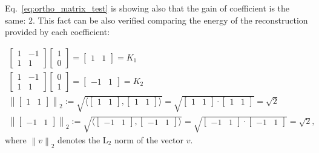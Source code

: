 Eq.~\ref{eq:ortho_matrix_test} is showing also that the gain of
coefficient is the same: $2$. This fact can be also verified comparing
the energy of the reconstruction provided by each coefficient:

\begin{equation*}
  \begin{array}{l}
    \begin{bmatrix}
      1 & -1 \\
      1 & 1
    \end{bmatrix}
    \begin{bmatrix}
      1 \\
      0
    \end{bmatrix}
    =
    \begin{bmatrix}
      1 & 1
    \end{bmatrix} = K_1
    \\
    \begin{bmatrix}
      1 & -1 \\
      1 & 1
    \end{bmatrix}
    \begin{bmatrix}
      0 \\
      1
    \end{bmatrix}
    =
    \begin{bmatrix}
      -1 & 1
    \end{bmatrix} = K_2
    \\
    \left\| \begin{bmatrix}1 & 1\end{bmatrix} \right\|_2 := \sqrt{\langle \begin{bmatrix}1 & 1\end{bmatrix}, \begin{bmatrix}1 & 1\end{bmatrix} \rangle} = \sqrt{\begin{bmatrix}1 & 1\end{bmatrix}\cdot \begin{bmatrix}1 & 1\end{bmatrix}} = \sqrt{2}\\
    \left\| \begin{bmatrix}-1 & 1\end{bmatrix} \right\|_2 := \sqrt{\langle \begin{bmatrix}-1 & 1\end{bmatrix}, \begin{bmatrix}-1 & 1\end{bmatrix} \rangle} = \sqrt{\begin{bmatrix}-1 & 1\end{bmatrix}\cdot \begin{bmatrix}-1 & 1\end{bmatrix}} = \sqrt{2},
  \end{array}
\end{equation*}
where $\left\|v \right\|_2$ denotes the L$_2$ norm of the vector $v$.


